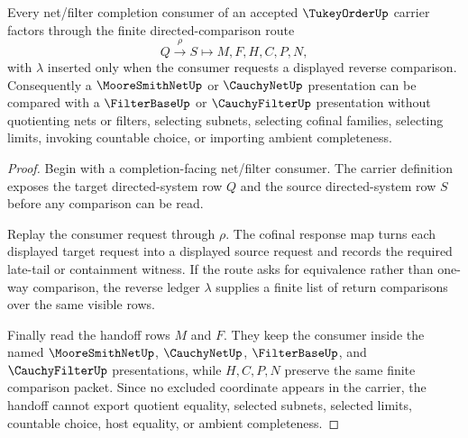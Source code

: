 \begin{theorem}
\label{thm:tukey-order-net-filter-handoff}
Every net/filter completion consumer of an accepted $\TukeyOrderUp$ carrier factors through the finite directed-comparison route
$$
Q \xrightarrow{\rho} S \longmapsto M,F,H,C,P,N ,
$$
with $\lambda$ inserted only when the consumer requests a displayed reverse comparison. Consequently a $\MooreSmithNetUp$ or $\CauchyNetUp$ presentation can be compared with a $\FilterBaseUp$ or $\CauchyFilterUp$ presentation without quotienting nets or filters, selecting subnets, selecting cofinal families, selecting limits, invoking countable choice, or importing ambient completeness.
\end{theorem}
\begin{proof}
Begin with a completion-facing net/filter consumer. The carrier definition exposes the target directed-system row $Q$ and the source directed-system row $S$ before any comparison can be read.

Replay the consumer request through $\rho$. The cofinal response map turns each displayed target request into a displayed source request and records the required late-tail or containment witness. If the route asks for equivalence rather than one-way comparison, the reverse ledger $\lambda$ supplies a finite list of return comparisons over the same visible rows.

Finally read the handoff rows $M$ and $F$. They keep the consumer inside the named $\MooreSmithNetUp$, $\CauchyNetUp$, $\FilterBaseUp$, and $\CauchyFilterUp$ presentations, while $H,C,P,N$ preserve the same finite comparison packet. Since no excluded coordinate appears in the carrier, the handoff cannot export quotient equality, selected subnets, selected limits, countable choice, host equality, or ambient completeness.
\end{proof}



